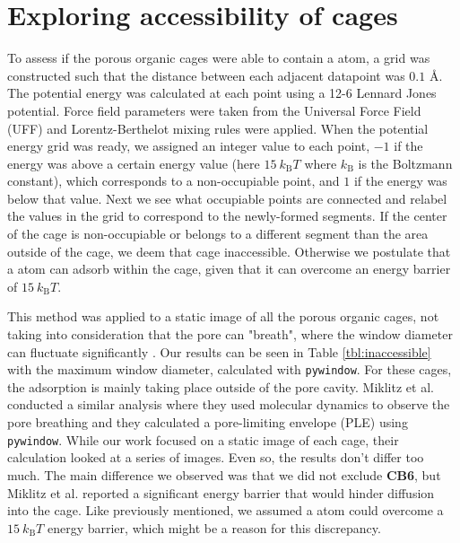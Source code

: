 \documentclass[journal=jacsat,manuscript=article]{achemso}
\begin{document}
\clearpage

\section{\color{red}Exploring accessibility of cages}
{\color{red}To assess if the porous organic cages were able to contain a  atom, a grid was constructed such that the distance between each adjacent datapoint was $0.1$ \AA. The potential energy was calculated at each point using a 12-6 Lennard Jones potential. Force field parameters were taken from the Universal Force Field (UFF) and Lorentz-Berthelot mixing rules were applied. When the potential energy grid was ready, we assigned an integer value to each point, $-1$ if the energy was above a certain energy value (here $15 \ k_\text{B}T$ where $k_\text{B}$ is the Boltzmann constant), which corresponds to a non-occupiable point, and $1$ if the energy was below that value. Next we see what occupiable points are connected and relabel the values in the grid to correspond to the newly-formed segments. If the center of the cage is non-occupiable or belongs to a different segment than the area outside of the cage, we deem that cage inaccessible. Otherwise we postulate that a  atom can adsorb within the cage, given that it can overcome an energy barrier of $15 \ k_\text{B}T$.

This method was applied to a static image of all the porous organic cages, not taking into consideration that the pore can "breath", where the window diameter can fluctuate significantly \cite{miklitz2017computational}. Our results can be seen in Table \ref{tbl:inaccessible} with the maximum window diameter, calculated with \texttt{pywindow}. For these cages, the adsorption is mainly taking place outside of the pore cavity. Miklitz et al.\cite{miklitz2017computational} conducted a similar analysis where they used molecular dynamics to observe the pore breathing and they calculated a pore-limiting envelope (PLE) using \texttt{pywindow}. While our work focused on a static image of each cage, their calculation looked at a series of images. Even so, the results don't differ too much. The main difference we observed was that we did not exclude \textbf{CB6}, but Miklitz et al. reported a significant energy barrier that would hinder diffusion into the cage. Like previously mentioned, we assumed a  atom could overcome a $15 \ k_\text{B}T$ energy barrier, which might be a reason for this discrepancy.

}
\end{document}

